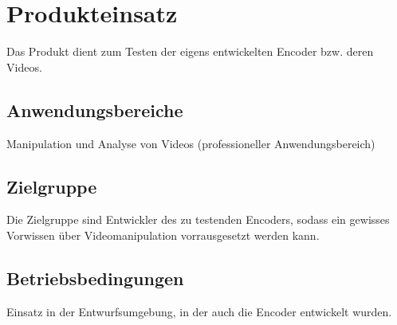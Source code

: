\section{Produkteinsatz}

Das Produkt dient zum Testen der eigens entwickelten Encoder bzw. deren Videos.

\subsection{Anwendungsbereiche}

Manipulation und Analyse von Videos (professioneller Anwendungsbereich)

\subsection{Zielgruppe}

Die Zielgruppe sind Entwickler des zu testenden Encoders, sodass ein gewisses Vorwissen über Videomanipulation vorrausgesetzt werden kann.

\subsection{Betriebsbedingungen}

Einsatz in der Entwurfsumgebung, in der auch die Encoder entwickelt wurden.
